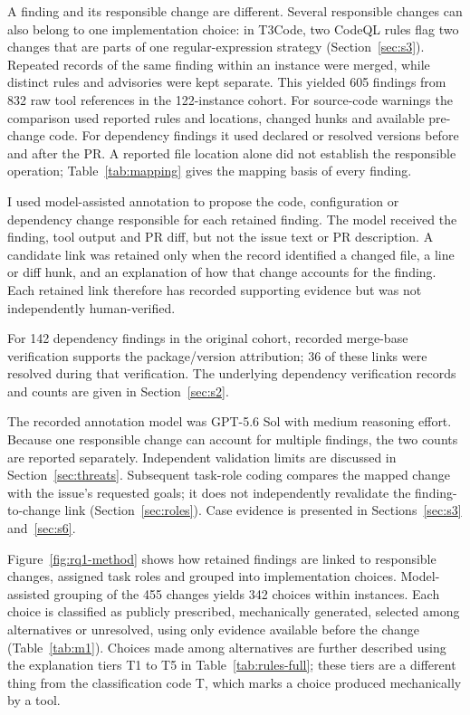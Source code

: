 \documentclass[acmsmall,screen,nonacm,review]{acmart}
\begin{document}
A finding and its responsible change are different. Several responsible changes can also belong to one implementation choice: in T3Code, two CodeQL rules flag two changes that are parts of one regular-expression strategy (Section~\ref{sec:s3}). Repeated records of the same finding within an instance were merged, while distinct rules and advisories were kept separate. This yielded 605 findings from 832 raw tool references in the 122-instance cohort. For source-code warnings the comparison used reported rules and locations, changed hunks and available pre-change code. For dependency findings it used declared or resolved versions before and after the PR. A reported file location alone did not establish the responsible operation; Table~\ref{tab:mapping} gives the mapping basis of every finding.

I used model-assisted annotation to propose the code, configuration or dependency change responsible for each retained finding. The model received the finding, tool output and PR diff, but not the issue text or PR description. A candidate link was retained only when the record identified a changed file, a line or diff hunk, and an explanation of how that change accounts for the finding. Each retained link therefore has recorded supporting evidence but was not independently human-verified.

For 142 dependency findings in the original cohort, recorded merge-base verification supports the package/version attribution; 36 of these links were resolved during that verification. The underlying dependency verification records and counts are given in Section~\ref{sec:s2}.

The recorded annotation model was GPT-5.6 Sol with medium reasoning effort. Because one responsible change can account for multiple findings, the two counts are reported separately. Independent validation limits are discussed in Section~\ref{sec:threats}. Subsequent task-role coding compares the mapped change with the issue's requested goals; it does not independently revalidate the finding-to-change link (Section~\ref{sec:roles}). Case evidence is presented in Sections~\ref{sec:s3} and~\ref{sec:s6}.

Figure~\ref{fig:rq1-method} shows how retained findings are linked to responsible changes, assigned task roles and grouped into implementation choices. Model-assisted grouping of the 455 changes yields 342 choices within instances. Each choice is classified as publicly prescribed, mechanically generated, selected among alternatives or unresolved, using only evidence available before the change (Table~\ref{tab:m1}). Choices made among alternatives are further described using the explanation tiers T1 to T5 in Table~\ref{tab:rules-full}; these tiers are a different thing from the classification code T, which marks a choice produced mechanically by a tool.
\end{document}
